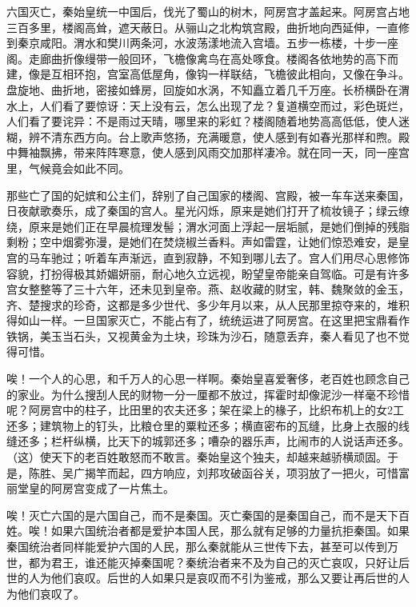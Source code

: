 \documentclass[12pt,UTF-8,openany,a4]{ctexbook}
\begin{document}
\begin{large}
    \yiwen 
    六国灭亡，秦始皇统一中国后，伐光了蜀山的树木，阿房宫才盖起来。阿房宫占地三百多里，楼阁高耸，遮天蔽日。从骊山之北构筑宫殿，曲折地向西延伸，一直修到秦京咸阳。渭水和樊川两条河，水波荡漾地流入宫墙。五步一栋楼，十步一座阁。走廊曲折像缦带一般回环，飞檐像禽鸟在高处啄食。楼阁各依地势的高下而建，像是互相环抱，宫室高低屋角，像钩一样联结，飞檐彼此相向，又像在争斗。盘旋地、曲折地，密接如蜂房，回旋如水涡，不知矗立着几千万座。长桥横卧在渭水上，人们看了要惊讶：天上没有云，怎么出现了龙？复道横空而过，彩色斑烂，人们看了要诧异：不是雨过天晴，哪里来的彩虹？楼阁随着地势高高低低，使人迷糊，辨不清东西方向。台上歌声悠扬，充满暖意，使人感到有如春光那样和煦。殿中舞袖飘拂，带来阵阵寒意，使人感到风雨交加那样凄冷。就在同一天，同一座宫里，气候竟会如此不同。
    
    那些亡了国的妃嫔和公主们，辞别了自己国家的楼阁、宫殿，被一车车送来秦国，日夜献歌奏乐，成了秦国的宫人。星光闪烁，原来是她们打开了梳妆镜子；绿云缭绕，原来是她们正在早晨梳理发髻；渭水河面上浮起一层垢腻，是她们倒掉的残脂剩粉；空中烟雾弥漫，是她们在焚烧椒兰香料。声如雷霆，让她们惊恐难安，是皇宫的马车驰过；听着车声渐远，直到寂静，不知到哪儿去了。宫人们用尽心思修饰容貌，打扮得极其娇媚妍丽，耐心地久立远视，盼望皇帝能亲自驾临。可是有许多宫女整整等了三十六年，还未见到皇帝。燕、赵收藏的财宝，韩、魏聚敛的金玉，齐、楚搜求的珍奇，这都是多少世代、多少年月以来，从人民那里掠夺来的，堆积得如山一样。一旦国家灭亡，不能占有了，统统运进了阿房宫。在这里把宝鼎看作铁锅，美玉当石头，又视黄金为土块，珍珠为沙石，随意丢弃，秦人看见了也不觉得可惜。
    
    唉！一个人的心思，和千万人的心思一样啊。秦始皇喜爱奢侈，老百姓也顾念自己的家业。为什么搜刮人民的财物一分一厘都不放过，挥霍时却像泥沙一样毫不珍惜呢？阿房宫中的柱子，比田里的农夫还多；架在梁上的椽子，比织布机上的女2工还多；建筑物上的钉头，比粮仓里的粟粒还多；横直密布的瓦缝，比身上衣服的线缝还多；栏杆纵横，比天下的城郭还多；嘈杂的器乐声，比闹市的人说话声还多。（这）使天下的老百姓敢怒而不敢言。秦始皇这个独夫，却越来越骄横顽固。于是，陈胜、吴广揭竿而起，四方响应，刘邦攻破函谷关，项羽放了一把火，可惜富丽堂皇的阿房宫变成了一片焦土。
    
    唉！灭亡六国的是六国自己，而不是秦国。灭亡秦国的是秦国自己，而不是天下百姓。唉！如果六国统治者都是爱护本国人民，那么就有足够的力量抗拒秦国。如果秦国统治者同样能爱护六国的人民，那么秦就能从三世传下去，甚至可以传到万世，都为君王，谁还能灭掉秦国呢？秦统治者来不及为自己的灭亡哀叹，只好让后世的人为他们哀叹。后世的人如果只是哀叹而不引为鉴戒，那么又要让再后世的人为他们哀叹了。
    
\end{large}
\end{document}
